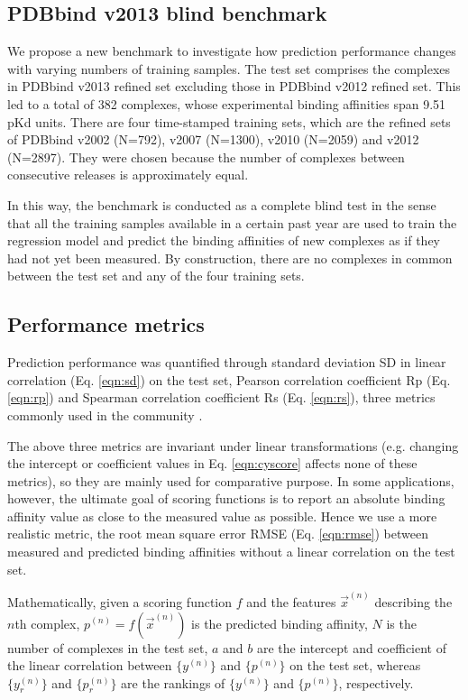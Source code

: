 \documentclass[journal=jacsat,manuscript=article]{achemso}
\begin{document}
\subsection{PDBbind v2013 blind benchmark}

We propose a new benchmark to investigate how prediction performance changes with varying numbers of training samples. The test set comprises the complexes in PDBbind v2013 refined set excluding those in PDBbind v2012 refined set. This led to a total of 382 complexes, whose experimental binding affinities span 9.51 pKd units. There are four time-stamped training sets, which are the refined sets of PDBbind v2002 (N=792), v2007 (N=1300), v2010 (N=2059) and v2012 (N=2897). They were chosen because the number of complexes between consecutive releases is approximately equal.

In this way, the benchmark is conducted as a complete blind test in the sense that all the training samples available in a certain past year are used to train the regression model and predict the binding affinities of new complexes as if they had not yet been measured. By construction, there are no complexes in common between the test set and any of the four training sets.

\subsection{Performance metrics}

Prediction performance was quantified through standard deviation SD in linear correlation (Eq. \ref{eqn:sd}) on the test set, Pearson correlation coefficient Rp (Eq. \ref{eqn:rp}) and Spearman correlation coefficient Rs (Eq. \ref{eqn:rs}), three metrics commonly used in the community \cite{1313}.

The above three metrics are invariant under linear transformations (e.g. changing the intercept or coefficient values in Eq. \ref{eqn:cyscore} affects none of these metrics), so they are mainly used for comparative purpose. In some applications, however, the ultimate goal of scoring functions is to report an absolute binding affinity value as close to the measured value as possible. Hence we use a more realistic metric, the root mean square error RMSE (Eq. \ref{eqn:rmse}) between measured and predicted binding affinities without a linear correlation on the test set.

Mathematically, given a scoring function $f$ and the features $\overrightarrow{x}^{(n)}$ describing the $n$th complex, $p^{(n)}=f(\overrightarrow{x}^{(n)})$ is the predicted binding affinity, $N$ is the number of complexes in the test set, $a$ and $b$ are the intercept and coefficient of the linear correlation between $\{y^{(n)}\}$ and $\{p^{(n)}\}$ on the test set, whereas $\{y_r^{(n)}\}$ and $\{p_r^{(n)}\}$ are the rankings of $\{y^{(n)}\}$ and $\{p^{(n)}\}$, respectively. 
\end{document}
